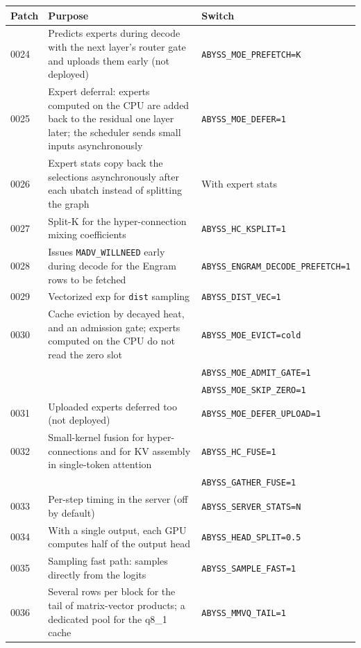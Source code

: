 \documentclass[11pt,a4paper]{article}
\newcommand{\code}[1]{\texttt{#1}}
\begin{document}
\begin{table}[h]
  \centering
  \small
  \begin{tabularx}{\textwidth}{@{}l X l@{}}
    \toprule
    Patch & Purpose & Switch \\
    \midrule
    0024 & Predicts experts during decode with the next layer's router gate and uploads them early (not deployed) & \code{ABYSS\_MOE\_PREFETCH=K} \\
    0025 & Expert deferral: experts computed on the CPU are added back to the residual one layer later; the scheduler sends small inputs asynchronously & \code{ABYSS\_MOE\_DEFER=1} \\
    0026 & Expert stats copy back the selections asynchronously after each ubatch instead of splitting the graph & With expert stats \\
    0027 & Split-K for the hyper-connection mixing coefficients & \code{ABYSS\_HC\_KSPLIT=1} \\
    0028 & Issues \code{MADV\_WILLNEED} early during decode for the Engram rows to be fetched & \code{ABYSS\_ENGRAM\_DECODE\_PREFETCH=1} \\
    0029 & Vectorized exp for \code{dist} sampling & \code{ABYSS\_DIST\_VEC=1} \\
    0030 & Cache eviction by decayed heat, and an admission gate; experts computed on the CPU do not read the zero slot & \code{ABYSS\_MOE\_EVICT=cold} \\
         & & \code{ABYSS\_MOE\_ADMIT\_GATE=1} \\
         & & \code{ABYSS\_MOE\_SKIP\_ZERO=1} \\
    0031 & Uploaded experts deferred too (not deployed) & \code{ABYSS\_MOE\_DEFER\_UPLOAD=1} \\
    0032 & Small-kernel fusion for hyper-connections and for KV assembly in single-token attention & \code{ABYSS\_HC\_FUSE=1} \\
         & & \code{ABYSS\_GATHER\_FUSE=1} \\
    0033 & Per-step timing in the server (off by default) & \code{ABYSS\_SERVER\_STATS=N} \\
    0034 & With a single output, each GPU computes half of the output head & \code{ABYSS\_HEAD\_SPLIT=0.5} \\
    0035 & Sampling fast path: samples directly from the logits & \code{ABYSS\_SAMPLE\_FAST=1} \\
    0036 & Several rows per block for the tail of matrix-vector products; a dedicated pool for the q8\_1 cache & \code{ABYSS\_MMVQ\_TAIL=1} \\

\end{tabularx}
\end{table}
\end{document}
